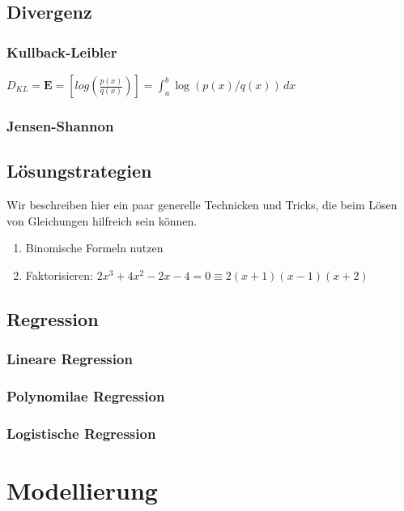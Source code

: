 \documentclass[letterpaper, titlepage]{article}
\begin{document}
\subsection{Divergenz}\label{Divergenz}

\subsubsection{Kullback-Leibler}\label{Kullback-Leibler}
$D_{KL}=\mathbf{E}=[log(\frac{p(x)}{q(x)} )]= \int_{a}^{b}  \log (p(x)/q(x))\,dx  $

\subsubsection{Jensen-Shannon}\label{Jensen-Shannon}


\subsection{Lösungstrategien}
Wir beschreiben hier ein paar generelle Technicken und Tricks, die beim Lösen von Gleichungen hilfreich sein können. 
\begin{enumerate}
    \item Binomische Formeln nutzen 
    \item Faktorisieren: $2x^3+4x^2-2x-4=0 \equiv 2(x+1)(x-1)(x+2)$
\end{enumerate}


\subsection{Regression}\label{Regression}

\subsubsection{Lineare Regression}\label{Lineare Regression}

\subsubsection{Polynomilae Regression}\label{Polynomilae Regression}

\subsubsection{Logistische Regression}\label{Logistische Regression}


\section{Modellierung}
\end{document}
